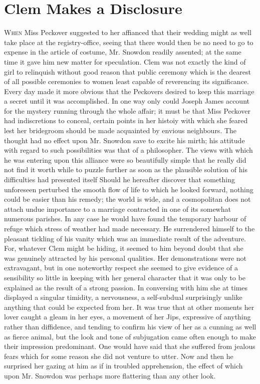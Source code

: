 \chapter{Clem Makes a Disclosure}

\textsc{When} Miss Peckover suggested to her affianced that their
wedding might as well take place at the registry-office, seeing that
there would then be no need to go to expense in the article of costume,
Mr. Snowdon readily assented; at the same time it gave him new matter
for speculation. Clem was not exactly the kind of girl to relinquish
without good reason that public ceremony which is the dearest of all
possible ceremonies to women least capable of reverencing its
significance. Every day made it more obvious that the Peckovers desired
to keep this marriage a secret until it was accomplished. In one way
only could Joseph James account for the mystery running through the
whole affair; it must be {\protect\hypertarget{60}{}{}}that Miss
Peckover had indiscretions to conceal, certain points in her histoiy
with which she feared lest her bridegroom should be made acquainted by
envious neighbours. The thought had no effect upon Mr. Snowdon save to
excite his mirth; his attitude with regard to such possibilities was
that of a philosopher. The views with which he was entering upon this
alliance were so beautifully simple that he really did not find it worth
while to puzzle further as soon as the plausible solution of his
difficulties had presented itself Should he hereafter discover that
something unforeseen perturbed the smooth flow of life to which he
looked forward, nothing could be easier than his remedy; the world is
wide, and a cosmopolitan does not attach undue importance to a marriage
contracted in one of its somewhat numerous parishes. In any case he
would have found the temporary harbour of refuge which stress of weather
had made necessary. He surrendered himself to the pleasant tickling of
his vanity which was an immediate result of the adventure. For,
{\protect\hypertarget{61}{}{}}whatever Clem might be hiding, it seemed
to him beyond doubt that she was genuinely attracted by his personal
qualities. Her demonstrations were not extravagant, but in one
noteworthy respect she seemed to give evidence of a sensibility so
little in keeping with her general character that it was only to be
explained as the result of a strong passion. In conversing with him she
at times displayed a singular timidity, a nervousness, a self-subdual
surprisingly unlike anything that could be expected from her. It was
true that at other moments her lover caught a gleam in her eyes, a
movement of her Jips, expressive of anything rather than diffidence, and
tending to confirm his view of her as a cunning as well as fierce
animal, but the look and tone of subjugation came often enough to make
their impression predominant. One would have said that she suffered from
jealous fears which for some reason she did not venture to utter. Now
and then he surprised her gazing at him as if in troubled apprehension,
the effect of which {\protect\hypertarget{62}{}{}}upon Mr. Snowdon was
perhaps more flattering than any other look.

